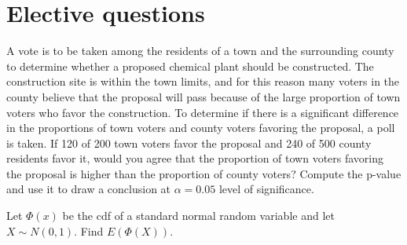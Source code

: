 \documentclass[letterpaper,10pt,addpoints]{exam}
\begin{document}
\section{Elective questions}

\begin{questions}
\question[10] A vote is to be taken among the residents of a town and the surrounding county to determine whether a proposed chemical plant should be constructed. The construction site is within the town limits, and for this reason many voters in the county believe that the proposal will pass because of the large proportion of town voters who favor the construction. To determine if there is a significant difference in the proportions of town voters and county voters favoring the proposal, a poll is taken. If 120 of 200 town voters favor the proposal and 240 of 500 county residents favor it, would you agree that the proportion of town voters favoring the proposal is higher than the proportion of county voters? Compute the p-value and use it to draw a conclusion at $\alpha=0.05$ level of significance.

\question[10] Let $\Phi(x)$ be the cdf of a standard normal random variable and let $X\sim N(0,1)$. Find $E(\Phi(X))$.


\end{questions}
\end{document}
